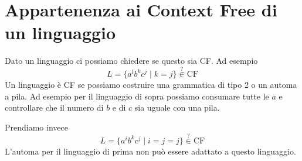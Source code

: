 \documentclass[12pt]{report}
\theoremstyle{definition}
\begin{document}
\section{Appartenenza ai Context Free di un linguaggio}
Dato un linguaggio ci possiamo chiedere se questo sia CF.
Ad esempio
$$ L = \{ a^l b^k c^j \mid k = j \} \overset{?}{\in} \text{CF} $$
Un linguaggio è CF se possiamo costruire una grammatica di tipo 2 o un automa a pila.
Ad esempio per il linguaggio di sopra possiamo consumare tutte le $a$ e controllare che il numero di $b$ e di $c$ sia uguale con una pila.

Prendiamo invece
$$ L = \{ a^i b^k c^j \mid i = j = j \} \overset{?}{\in} \text{CF} $$
L'automa per il linguaggio di prima non può essere adattato a questo linguaggio.
\end{document}
